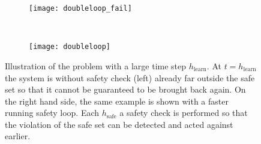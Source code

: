 \documentclass[../main.tex]{subfiles}
\begin{document}
\begin{figure}[H]
    \centering
    \begin{subfigure}[t]{0.45\textwidth}
        \texttt{[image: doubleloop\_fail]}
    \end{subfigure}%
    ~ 
    \begin{subfigure}[t]{0.55\textwidth}
        \texttt{[image: doubleloop]}
        \end{subfigure}
        \caption{Illustration of the problem with a large time step $h_{\text{learn}}$. At $t= h_{\text{learn}}$ the system is without safety check (left) already far outside the safe set so that it cannot be guaranteed to be brought back again. On the right hand side, the same example is shown with a faster running safety loop. Each $h_{\text{safe}}$ a safety check is performed so that the violation of the safe set can be detected and acted against earlier.}\label{fig:doubleloop}  
\end{figure}
\end{document}
